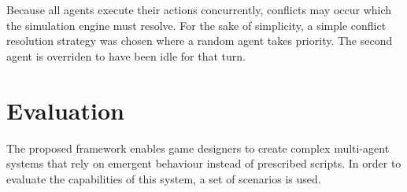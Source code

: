 Because all agents execute their actions concurrently, conflicts may occur which the simulation engine must resolve.
For the sake of simplicity, a simple conflict resolution strategy was chosen where a random agent takes priority.
The second agent is overriden to have been idle for that turn.

\section{Evaluation}

The proposed framework enables game designers to create complex multi-agent systems that rely on emergent behaviour instead of prescribed scripts.
In order to evaluate the capabilities of this system, a set of scenarios is used.






